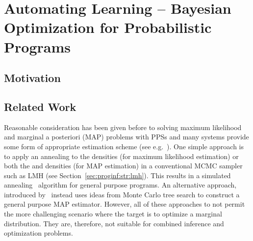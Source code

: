 %

\chapter{Automating Learning -- Bayesian Optimization for Probabilistic Programs}
\label{chp:bopp}



\section{Motivation} 
\label{sec:IntroductionBOPP}



\section{Related Work} 
\label{sec:bopp:related}

Reasonable consideration has been given before to solving maximum likelihood and marginal 
a posteriori (MAP) problems with PPSs and many systems provide some form of appropriate
estimation scheme (see e.g.~\citep{carpenter2015stan,salvatier2016probabilistic}).  One simple
approach is to apply an annealing to the \observe densities (for maximum likelihood estimation)
or both the \sample and \observe densities (for MAP estimation) in
a conventional MCMC sampler such as LMH (see Section~\ref{sec:proginf:str:lmh}).
This results in a simulated annealing~\citep{aarts1988simulated} algorithm for general purpose programs.
An alternative approach, introduced by~\cite{tolpin-socs-2015}
instead uses ideas from Monte Carlo tree search to construct a general purpose MAP estimator.
However, all of these approaches to not permit the more challenging scenario
where the target is to optimize a marginal distribution.  They are, therefore, not suitable for combined
inference and optimization problems.

